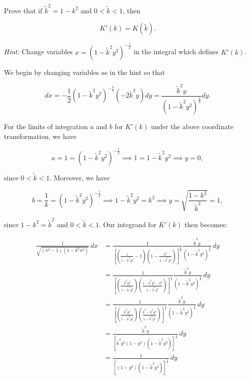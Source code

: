 Prove that if $\tilde{k}^2 = 1 - k^2$ and $0 < \tilde{k} < 1$, then

$$
K'(k) = K(\tilde{k}).
$$

\newcommand{\kt}{\tilde{k}}

\textit{Hint:} Change variables $x = \left(1 - \tilde{k}^2 y^2\right)^{-\frac{1}{2}}$ in the integral which defines $K'(k)$.

\begin{solution}
  We begin by changing variables as in the hint so that

  $$
  dx = -\frac{1}{2}\left(1 - \kt^2 y^2 \right)^{-\frac{3}{2}}\left(-2 \kt^2 y\right) dy 
     = \frac{\kt^2 y}{\left(1 - \kt^2 y^2\right)^{\frac{3}{2}}} dy.
  $$

  For the limits of integration $a$ and $b$ for $K'(k)$ under the above coordinate transformation, we have

  $$
  a = 1 
    = \left(1 - \kt^2 y^2\right)^{-\frac{1}{2}} 
      \implies 1 = 1 - \kt^2 y^2 
      \implies y = 0,
  $$

  since $0 < \kt < 1$. Moreover, we have

  $$
  b = \frac{1}{k} 
    = \left(1 - \kt^2 y^2\right)^{-\frac{1}{2}} 
      \implies 1 - \kt^2 y^2 = k^2 
      \implies y = \sqrt{\frac{1 - k^2}{\kt^2}} = 1,
  $$

  since $1 - k^2 = \kt^2$ and $0 < \kt < 1$. Our integrand for $K'(k)$ then becomes:

  \begin{align*}
    \frac{1}{\sqrt{\left(x^2 - 1\right)\left(1 - k^2 x^2\right)}} \, dx
      &= \frac{1}{\left[\left(\frac{1}{1 - \kt^2 y^2} - 1 \right) \left(1 - \frac{k^2}{1 - \kt^2 y^2} \right)\right]^{\frac{1}{2}}}
         \frac{\kt^2 y}{\left(1 - \kt^2 y^2\right)^{\frac{3}{2}}} \, dy \\
      &= \frac{1}{\left[\left(\frac{\kt^2 y^2}{1 - \kt^2 y^2}\right) \left(\frac{1 - \kt^2 y^2 - k^2}{1 - \kt^2 y^2} \right)\right]^{\frac{1}{2}}}
         \frac{\kt^2 y}{\left(1 - \kt^2 y^2\right)^{\frac{3}{2}}} \, dy \\
      &= \frac{1}{\left[\left(\frac{\kt^2 y^2}{1 - \kt^2 y^2}\right) \left(\frac{\kt^2 - \kt^2 y^2}{1 - \kt^2 y^2} \right)\right]^{\frac{1}{2}}}
         \frac{\kt^2 y}{\left(1 - \kt^2 y^2\right)^{\frac{3}{2}}} \, dy \\
      &= \frac{\kt^2 y}{\left[\kt^4 y^2 (1 - y^2)(1 - \kt^2 y^2) \right]^{\frac{1}{2}}} \, dy \\
      &= \frac{1}{\left[(1 - y^2)(1 - \kt^2 y^2) \right]^{\frac{1}{2}}} \, dy \\
  \end{align*}


\end{solution}
